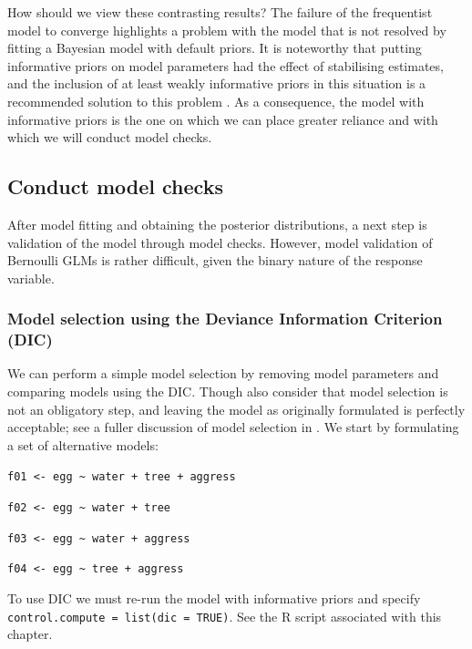 \documentclass[
]{book}
\begin{document}
How should we view these contrasting results? The failure of the frequentist model to converge highlights a problem with the model that is not resolved by fitting a Bayesian model with default priors. It is noteworthy that putting informative priors on model parameters had the effect of stabilising estimates, and the inclusion of at least weakly informative priors in this situation is a recommended solution to this problem \citep{Gelman_2008}. As a consequence, the model with informative priors is the one on which we can place greater reliance and with which we will conduct model checks.

\hypertarget{conduct-model-checks-3}{%
\subsection{Conduct model checks}\label{conduct-model-checks-3}}

After model fitting and obtaining the posterior distributions, a next step is validation of the model through model checks. However, model validation of Bernoulli GLMs is rather difficult, given the binary nature of the response variable.

\hypertarget{bern-dic}{%
\subsubsection{Model selection using the Deviance Information Criterion (DIC)}\label{bern-dic}}

We can perform a simple model selection by removing model parameters and comparing models using the DIC. Though also consider that model selection is not an obligatory step, and leaving the model as originally formulated is perfectly acceptable; see a fuller discussion of model selection in \citep{Smith_etal_2020}. We start by formulating a set of alternative models:

\texttt{f01\ \textless{}-\ egg\ \textasciitilde{}\ water\ +\ tree\ +\ aggress}

\texttt{f02\ \textless{}-\ egg\ \textasciitilde{}\ water\ +\ tree}

\texttt{f03\ \textless{}-\ egg\ \textasciitilde{}\ water\ +\ aggress}

\texttt{f04\ \textless{}-\ egg\ \textasciitilde{}\ tree\ +\ aggress}

To use DIC we must re-run the model with informative priors and specify \texttt{control.compute\ =\ list(dic\ =\ TRUE)}. See the R script associated with this chapter.
\end{document}
